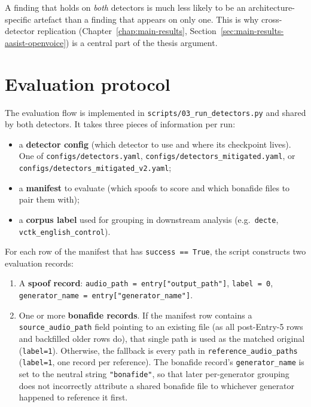 A finding that holds on \emph{both} detectors is much less likely
to be an architecture-specific artefact than a finding that appears
on only one. This is why cross-detector replication
(Chapter~\ref{chap:main-results},
Section~\ref{sec:main-results-aasist-openvoice}) is a central part
of the thesis argument.


\section{Evaluation protocol}
\label{sec:methodology-evaluation-protocol}

The evaluation flow is implemented in
\texttt{scripts/03\_run\_detectors.py} and shared by both detectors.
It takes three pieces of information per run:

\begin{itemize}
    \item a \textbf{detector config} (which detector to use and where its
        checkpoint lives). One of \texttt{configs/detectors.yaml},
        \texttt{configs/detectors\_mitigated.yaml}, or
        \texttt{configs/detectors\_mitigated\_v2.yaml};
    \item a \textbf{manifest} to evaluate (which spoofs to score and which
        bonafide files to pair them with);
    \item a \textbf{corpus label} used for grouping in downstream analysis
        (e.g.\ \texttt{decte}, \texttt{vctk\_english\_control}).
\end{itemize}

For each row of the manifest that has \texttt{success == True}, the
script constructs two evaluation records:

\begin{enumerate}
    \item A \textbf{spoof record}: \texttt{audio\_path = entry["output\_path"]},
        \texttt{label = 0}, \texttt{generator\_name = entry["generator\_name"]}.
    \item One or more \textbf{bonafide records}. If the manifest row contains a
        \texttt{source\_audio\_path} field pointing to an existing file (as all
        post-Entry-5 rows and backfilled older rows do), that single path
        is used as the matched original (\texttt{label=1}). Otherwise, the fallback
        is every path in \texttt{reference\_audio\_paths} (\texttt{label=1}, one record
        per reference). The bonafide record's \texttt{generator\_name} is set to
        the neutral string \texttt{"bonafide"}, so that later per-generator
        grouping does not incorrectly attribute a shared bonafide file
        to whichever generator happened to reference it first.
\end{enumerate}

